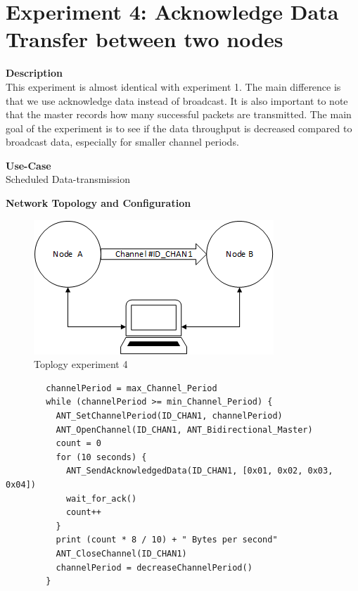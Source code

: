 \section{Experiment 4: Acknowledge Data Transfer between two nodes}
\begin{description} 
	\item{\textbf{Description}} \hfill \\ This experiment is almost identical with experiment 1. The main difference is that we use acknowledge data instead of broadcast. It is also important to note that the master records how many successful packets are transmitted. The main goal of the experiment is to see if the data throughput is decreased compared to broadcast data, especially for smaller channel periods.
	\item{\textbf{Use-Case}} \hfill \\ Scheduled Data-transmission
	\item{\textbf{Network Topology and Configuration}} \hfill \\
	\begin{figure}[H]
		\centering
		\includegraphics[scale=1]{./pics/exp_topo.png}
		\caption{Toplogy experiment 4}
	\end{figure}
	\begin{code}[H]
		\begin{verbatim}
		channelPeriod = max_Channel_Period
		while (channelPeriod >= min_Channel_Period) {
		  ANT_SetChannelPeriod(ID_CHAN1, channelPeriod)
		  ANT_OpenChannel(ID_CHAN1, ANT_Bidirectional_Master)
		  count = 0
		  for (10 seconds) {
		    ANT_SendAcknowledgedData(ID_CHAN1, [0x01, 0x02, 0x03, 0x04])	   
		    wait_for_ack()
		    count++
		  }
		  print (count * 8 / 10) + " Bytes per second"	  
		  ANT_CloseChannel(ID_CHAN1)
		  channelPeriod = decreaseChannelPeriod()
		} 
		\end{verbatim}
		\caption{Acknowledge data transfer (Master)}\label{lst:mExp4}
	\end{code}
			

\end{description}
